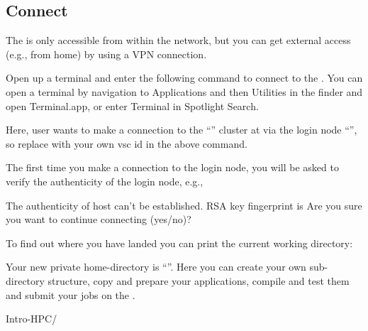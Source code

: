   \subsection{Connect}
  \label{sec:connect}

  The \hpc is only accessible from within the \university network, but you can
  get external access (e.g., from home) by using a VPN connection.

  Open up a terminal and enter the following command to connect to the \hpc.
  \ifmac
  You can open a terminal by navigation to Applications and then Utilities in the finder and open Terminal.app, or enter Terminal in Spotlight Search.
  \fi

  \begin{prompt}
  \end{prompt}

  Here, user \userid wants to make a connection to the ``\hpcname'' cluster at
  \university via the login node ``\loginnode'', so replace \userid with your own
  vsc id in the above command.
  
  The first time you make a connection to the login node, you will be asked to
  verify the authenticity of the login node, e.g.,
  
  \begin{prompt}
  The authenticity of host %
  can't be established.
  RSA key fingerprint is %
  Are you sure you want to continue connecting (yes/no)? %
  \end{prompt}
  
\fi

To find out where you have landed you can print the current working directory:
\begin{prompt}
\end{prompt}


Your new private home-directory is ``\homedir''.
Here you can create your own sub-directory structure, copy and prepare your
applications, compile and test them and submit your jobs on the \hpc.

\begin{prompt}
Intro-HPC/
\end{prompt}

